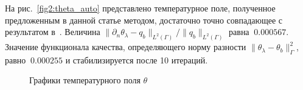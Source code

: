 \documentclass[12pt]{article}
\begin{document}
    На рис.~\ref{fig2:theta_auto} представлено температурное поле, полученное
    предложенным в данной статье методом, достаточно точно совпадающее с результатом в~\cite{CNSNS19}.
    Величина $\|\partial_n\theta_\lambda-q_b\|_{L^2(\Gamma)}/\|q_b\|_{L^2(\Gamma)}$ равна $~0.000567$.
    Значение функционала качества, определяющего норму разности $\|\theta_\lambda -\theta_b\|^2_\Gamma$,
    равно $~0.000255$ и стабилизируется после 10 итераций.

    \begin{figure}[H]
        \label{fig:fig2}
        \centering
        \caption{Графики температурного поля $\theta$}
    \end{figure}

    \begin{figure}[H]
        \centering
        \caption{}
        \label{fig3}
    \end{figure}
\end{document}

